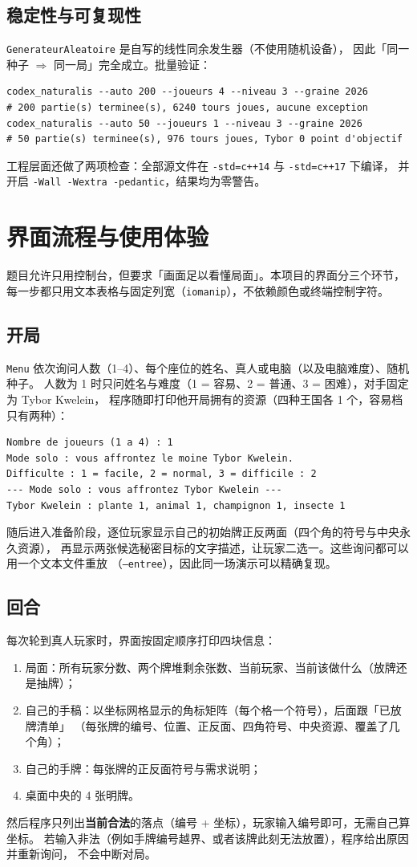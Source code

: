 \documentclass[11pt,a4paper]{ctexart}
\newcommand{\cl}[1]{\texttt{#1}}
\begin{document}
\subsection{稳定性与可复现性}
\cl{GenerateurAleatoire} 是自写的线性同余发生器（不使用随机设备），
因此「同一种子 $\Rightarrow$ 同一局」完全成立。批量验证：
\begin{lstlisting}
codex_naturalis --auto 200 --joueurs 4 --niveau 3 --graine 2026
# 200 partie(s) terminee(s), 6240 tours joues, aucune exception
codex_naturalis --auto 50 --joueurs 1 --niveau 3 --graine 2026
# 50 partie(s) terminee(s), 976 tours joues, Tybor 0 point d'objectif
\end{lstlisting}
工程层面还做了两项检查：全部源文件在 \cl{-std=c++14} 与 \cl{-std=c++17} 下编译，
并开启 \cl{-Wall -Wextra -pedantic}，结果均为零警告。

\section{界面流程与使用体验}
题目允许只用控制台，但要求「画面足以看懂局面」。本项目的界面分三个环节，
每一步都只用文本表格与固定列宽（\cl{iomanip}），不依赖颜色或终端控制字符。

\subsection{开局}
\cl{Menu} 依次询问人数（1--4）、每个座位的姓名、真人或电脑（以及电脑难度）、随机种子。
人数为 1 时只问姓名与难度（1 = 容易、2 = 普通、3 = 困难），对手固定为 Tybor Kwelein，
程序随即打印他开局拥有的资源（四种王国各 1 个，容易档只有两种）：
\begin{lstlisting}
Nombre de joueurs (1 a 4) : 1
Mode solo : vous affrontez le moine Tybor Kwelein.
Difficulte : 1 = facile, 2 = normal, 3 = difficile : 2
--- Mode solo : vous affrontez Tybor Kwelein ---
Tybor Kwelein : plante 1, animal 1, champignon 1, insecte 1
\end{lstlisting}
随后进入准备阶段，逐位玩家显示自己的初始牌正反两面（四个角的符号与中央永久资源），
再显示两张候选秘密目标的文字描述，让玩家二选一。这些询问都可以用一个文本文件重放
（\cl{--entree}），因此同一场演示可以精确复现。

\subsection{回合}
每次轮到真人玩家时，界面按固定顺序打印四块信息：
\begin{enumerate}
\item 局面：所有玩家分数、两个牌堆剩余张数、当前玩家、当前该做什么（放牌还是抽牌）；
\item 自己的手稿：以坐标网格显示的角标矩阵（每个格一个符号），后面跟「已放牌清单」
      （每张牌的编号、位置、正反面、四角符号、中央资源、覆盖了几个角）；
\item 自己的手牌：每张牌的正反面符号与需求说明；
\item 桌面中央的 4 张明牌。
\end{enumerate}
然后程序只列出\textbf{当前合法}的落点（编号 + 坐标），玩家输入编号即可，无需自己算坐标。
若输入非法（例如手牌编号越界、或者该牌此刻无法放置），程序给出原因并重新询问，
不会中断对局。
\end{document}
